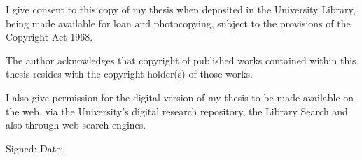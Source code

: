 {I give consent to this copy of my thesis when deposited in the University Library, being made available for loan and photocopying, subject to the provisions of the Copyright Act 1968.

The author acknowledges that copyright of published works contained within this thesis resides with the copyright holder(s) of those works.

I also give permission for the digital version of my thesis to be made available on the web, via the University's digital research repository, the Library Search and also through web search engines.


Signed: \dotfill\quad 
Date: \dotfill

}